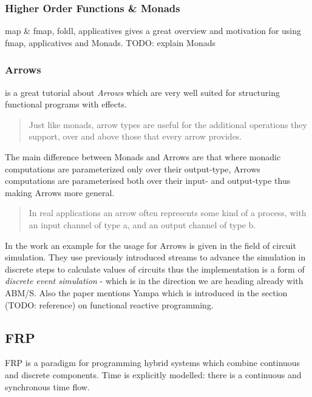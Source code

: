 \subsubsection{Higher Order Functions \& Monads}
map \& fmap, foldl, applicatives
\cite{hutton_programming_2007} gives a great overview and motivation for using fmap, applicatives and Monads. TODO: explain Monads

\subsubsection{Arrows}
\cite{Hughes2004} is a great tutorial about \textit{Arrows} which are very well suited for structuring functional programs with effects.

\begin{quote}
Just like monads, arrow types are useful for the additional operations they support, over and above those that every arrow provides.
\end{quote}

The main difference between Monads and Arrows are that where monadic computations are parameterized only over their output-type, Arrows computations are parameterised both over their input- and output-type thus making Arrows more general.

\begin{quote}
In real applications an arrow often represents some kind of a process, with an input channel of type a, and an output channel of type b.
\end{quote}

In the work \cite{Hughes2004} an example for the usage for Arrows is given in the field of circuit simulation. They use previously introduced streams to advance the simulation in discrete steps to calculate values of circuits thus the implementation is a form of \textit{discrete event simulation} - which is in the direction we are heading already with ABM/S. Also the paper mentions Yampa which is introduced in the section (TODO: reference) on functional reactive programming.

\subsection{FRP}
FRP is a paradigm for programming hybrid systems which combine continuous and discrete components. Time is explicitly modelled: there is a continuous and synchronous time flow.  \\

